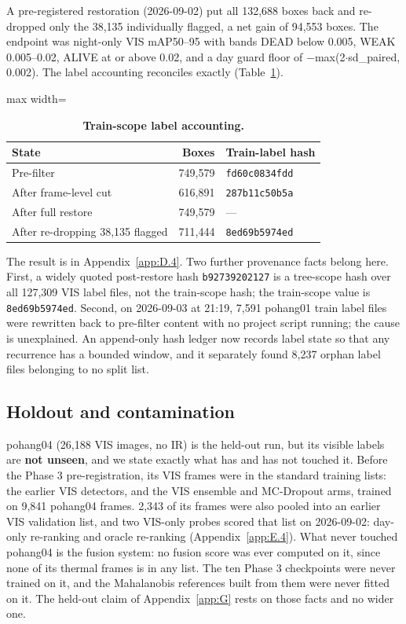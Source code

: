 \documentclass[10pt]{article}
\begin{document}
A pre-registered restoration (2026-09-02) put all 132,688 boxes back and re-dropped only the 38,135 individually flagged, a net gain of 94,553 boxes. The endpoint was night-only VIS mAP50--95 with bands DEAD below 0.005, WEAK 0.005--0.02, ALIVE at or above 0.02, and a day guard floor of $-$max(2$\cdot$sd\_paired, 0.002). The label accounting reconciles exactly (Table~\ref{tab:5}).

\begin{table}[htbp]
\centering
\small
\caption{\textbf{Train-scope label accounting.}}
\label{tab:5}
\begin{adjustbox}{max width=\linewidth}
\begin{tabular}{lrl}
\toprule
State & Boxes & Train-label hash \\
\midrule
Pre-filter & 749,579 & \texttt{fd60c0834fdd} \\
After frame-level cut & 616,891 & \texttt{287b11c50b5a} \\
After full restore & 749,579 & --- \\
After re-dropping 38,135 flagged & 711,444 & \texttt{8ed69b5974ed} \\
\bottomrule
\end{tabular}
\end{adjustbox}
\end{table}
The result is in Appendix~\ref{app:D.4}. Two further provenance facts belong here. First, a widely quoted post-restore hash \texttt{b92739202127} is a tree-scope hash over all 127,309 VIS label files, not the train-scope hash; the train-scope value is \texttt{8ed69b5974ed}. Second, on 2026-09-03 at 21:19, 7,591 pohang01 train label files were rewritten back to pre-filter content with no project script running; the cause is unexplained. An append-only hash ledger now records label state so that any recurrence has a bounded window, and it separately found 8,237 orphan label files belonging to no split list.

\subsection{Holdout and contamination}\label{app:A.5}
pohang04 (26,188 VIS images, no IR) is the held-out run, but its visible labels are \textbf{not unseen}, and we state exactly what has and has not touched it. Before the Phase 3 pre-registration, its VIS frames were in the standard training lists: the earlier VIS detectors, and the VIS ensemble and MC-Dropout arms, trained on 9,841 pohang04 frames. 2,343 of its frames were also pooled into an earlier VIS validation list, and two VIS-only probes scored that list on 2026-09-02: day-only re-ranking and oracle re-ranking (Appendix~\ref{app:E.4}). What never touched pohang04 is the fusion system: no fusion score was ever computed on it, since none of its thermal frames is in any list. The ten Phase 3 checkpoints were never trained on it, and the Mahalanobis references built from them were never fitted on it. The held-out claim of Appendix~\ref{app:G} rests on those facts and no wider one.
\end{document}
